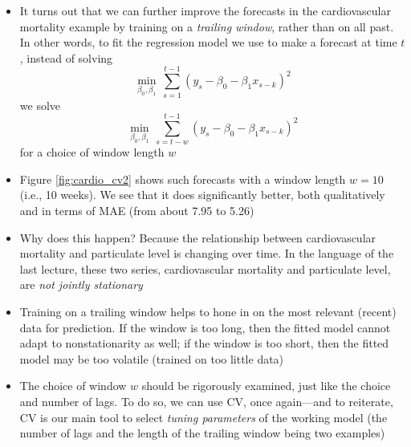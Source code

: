 \documentclass{article}
\begin{document}
\begin{itemize}
\item It turns out that we can further improve the forecasts in the
  cardiovascular mortality example by training on a \emph{trailing window},
  rather than on all past. In other words, to fit the regression model we use to
  make a forecast at time $t$, instead of solving  
  \[
  \min_{\beta_0,\beta_1} \, \sum_{s=1}^{t-1} (y_s - \beta_0 - \beta_1 x_{s-k})^2
  \]
  we solve
  \[
  \min_{\beta_0,\beta_1} \, \sum_{s={t-w}}^{t-1} (y_s - \beta_0 - \beta_1 x_{s-k})^2
  \]
  for a choice of window length $w$

\item Figure \ref{fig:cardio_cv2} shows such forecasts with a window length $w = 
  10$ (i.e., 10 weeks). We see that it does significantly better, both
  qualitatively and in terms of MAE (from about 7.95 to 5.26)

\item Why does this happen? Because the relationship between cardiovascular
  mortality and particulate level is changing over time. In the language of the
  last lecture, these two series, cardiovascular mortality and particulate
  level, are \emph{not jointly stationary} 

\item Training on a trailing window helps to hone in on the most relevant
  (recent) data for prediction. If the window is too long, then the fitted model
  cannot adapt to nonstationarity as well; if the window is too short, then the
  fitted model may be too volatile (trained on too little data)

\item The choice of window $w$ should be rigorously examined, just like the 
  choice and number of lags. To do so, we can use CV, once again---and to
  reiterate, CV is our main tool to select \emph{tuning parameters} of the
  working model (the number of lags and the length of the trailing window being
  two examples) 
\end{itemize}
\end{document}

